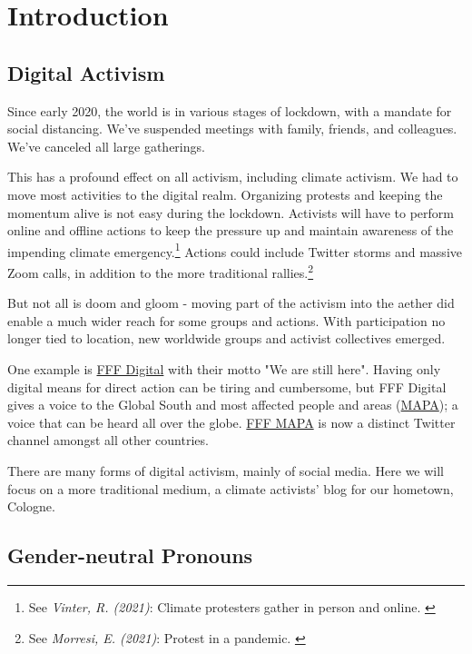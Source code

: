 %
%

\pagebreak
\section{Introduction}

\onehalfspacing

\subsection{Digital Activism}

Since early 2020, the world is in various stages of lockdown, with a mandate for social distancing. We've suspended meetings with family, friends, and colleagues. We've canceled all large gatherings.

This has a profound effect on all activism, including climate activism. We had to move most activities to the digital realm. Organizing protests and keeping the momentum alive is not easy during the lockdown. Activists will have to perform online and offline actions to keep the pressure up and maintain awareness of the impending climate emergency.\footnote{See \textit{Vinter, R. (2021)}: Climate protesters gather in person and online. \cite{climateProtest}} Actions could include Twitter storms and massive Zoom calls, in addition to the more traditional rallies.\footnote{See \textit{Morresi, E. (2021)}: Protest in a pandemic. \cite{pandemicProtest}} 

But not all is doom and gloom - moving part of the activism into the aether did enable a much wider reach for some groups and actions. With participation no longer tied to location, new worldwide groups and activist collectives emerged. 

One example is \href{https://fffdigital.carrd.co/}{FFF Digital} with their motto "We are still here". Having only digital means for direct action can be tiring and cumbersome, but FFF Digital gives a voice to the Global South and most affected people and areas (\href{https://fridaysforfuture.org/country/mapa/}{MAPA}); a voice that can be heard all over the globe. \href{https://twitter.com/fffmapa}{FFF MAPA} is now a distinct Twitter channel amongst all other countries.

There are many forms of digital activism, mainly of social media. Here we will focus on a more traditional medium, a climate activists' blog for our hometown, Cologne.

\subsection{Gender-neutral Pronouns}

